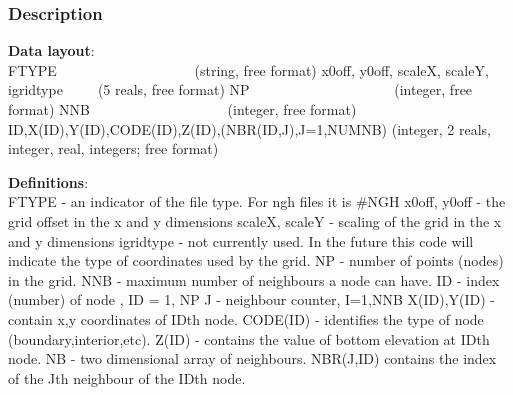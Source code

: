 \documentclass{article}
\begin{document}
\subsubsection[Description]{Description}

\textbf{Data layout}: \\ 

\noindent
FTYPE \ \ \ \ \ \ \ \ \ \ \ \ \ \ \ \ \ \ \ (string, free format) \newline
x0off, y0off, scaleX, scaleY, igridtype\ \ \ \ \ (5 reals, free format)\newline
NP \ \ \ \ \ \ \ \ \ \ \ \ \ \ \ \ \ \ \ \ (integer, free format)\newline
NNB \ \ \ \ \ \ \ \ \ \ \ \ \ \ \ \ \ \ \ (integer, free format)\newline
ID,X(ID),Y(ID),CODE(ID),Z(ID),(NBR(ID,J),J=1,NUMNB)\newline
(integer, 2 reals, integer, real, integers; free format) \newline

\noindent\textbf{Definitions}:\\ 

\noindent
FTYPE - an indicator of the file type.  For ngh files it is \#NGH \newline
x0off, y0off - the grid offset in the x and y dimensions \newline
scaleX, scaleY - scaling of the grid in the x and y dimensions \newline
igridtype - not currently used.  In the future this code will indicate the type of coordinates used by the grid. \newline
NP - number of points (nodes) in the grid.\newline
NNB - maximum number of neighbours a node can have.\newline
ID - index (number) of node , ID = 1, NP\newline
J  - neighbour counter, I=1,NNB\newline
X(ID),Y(ID) - contain x,y coordinates of IDth node.\newline
CODE(ID) - identifies the type of node (boundary,interior,etc).\newline
Z(ID) - contains the value of bottom elevation at IDth node.\newline
NB - two dimensional array of neighbours.\newline
NBR(J,ID) contains the index of the Jth neighbour of the IDth node.

\newpage
\end{document}
